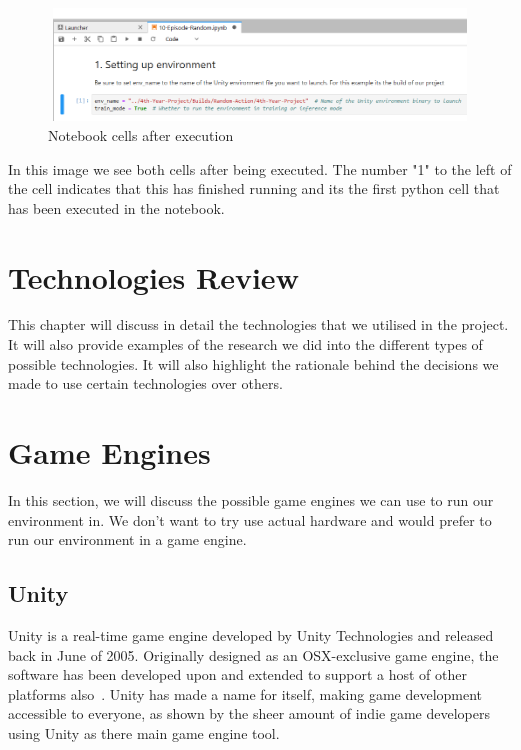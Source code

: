 \begin{figure}[H]
    \centering
    \includegraphics[width=115mm, height=30mm]{img/Notebook2.PNG}
    \caption{Notebook cells after execution}
    \label{fig:sd4}
\end{figure}

\begin{flushleft}
In this image we see both cells after being executed. The number "1" to the left of the cell indicates that this has finished running and its the first python cell that has been executed in the notebook. 
\end{flushleft}


\section{Technologies Review}
This chapter will discuss in detail the technologies that we utilised in the project. It will also provide examples of the research we did into the different types of possible technologies. It will also highlight the rationale behind the decisions we made to use certain technologies over others.

\section{Game Engines}
In this section, we will discuss the possible game engines we can use to run our environment in. We don't want to try use actual hardware and would prefer to run our environment in a game engine.

\subsection{Unity}
Unity is a real-time game engine developed by Unity Technologies and released back in June of 2005. Originally designed as an OSX-exclusive game engine, the software has been developed upon and extended to support a host of other platforms also~\cite{unityWebsite}. Unity has made a name for itself, making game development accessible to everyone, as shown by the sheer amount of indie game developers using Unity as there main game engine tool.

